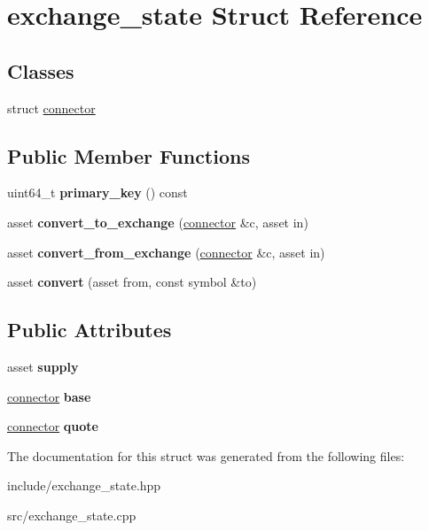 \hypertarget{structexchange__state}{}\section{exchange\+\_\+state Struct Reference}
\label{structexchange__state}
\subsection*{Classes}
\begin{DoxyCompactItemize}
\item 
struct \mbox{\hyperlink{structexchange__state_1_1connector}{connector}}
\end{DoxyCompactItemize}
\subsection*{Public Member Functions}
\begin{DoxyCompactItemize}
\item 
\mbox{\label{structexchange__state_a7891948a4c98433065f6297a846770b4}} 
uint64\+\_\+t {\bfseries primary\+\_\+key} () const
\item 
\mbox{\label{structexchange__state_ac3dab3448c9d5bb55770d33d95f688ba}} 
asset {\bfseries convert\+\_\+to\+\_\+exchange} (\mbox{\hyperlink{structexchange__state_1_1connector}{connector}} \&c, asset in)
\item 
\mbox{\label{structexchange__state_a65e34e352f066f1dae0385b2e6aa333e}} 
asset {\bfseries convert\+\_\+from\+\_\+exchange} (\mbox{\hyperlink{structexchange__state_1_1connector}{connector}} \&c, asset in)
\item 
\mbox{\label{structexchange__state_aa791a6a6eac2f7a8c7b5615bc57f177b}} 
asset {\bfseries convert} (asset from, const symbol \&to)
\end{DoxyCompactItemize}
\subsection*{Public Attributes}
\begin{DoxyCompactItemize}
\item 
\mbox{\label{structexchange__state_aed724d12bf57c748a1bd1cae697323e3}} 
asset {\bfseries supply}
\item 
\mbox{\label{structexchange__state_ac347aedb89368530adf4740be02822bd}} 
\mbox{\hyperlink{structexchange__state_1_1connector}{connector}} {\bfseries base}
\item 
\mbox{\label{structexchange__state_a72f37d7232ee04314ea2096e923c6ad5}} 
\mbox{\hyperlink{structexchange__state_1_1connector}{connector}} {\bfseries quote}
\end{DoxyCompactItemize}


The documentation for this struct was generated from the following files\+:\begin{DoxyCompactItemize}
\item 
include/exchange\+\_\+state.\+hpp\item 
src/exchange\+\_\+state.\+cpp\end{DoxyCompactItemize}
